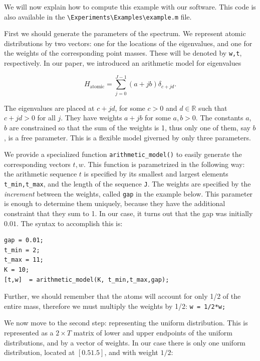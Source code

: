 \documentclass[english,11pt]{article} %
\begin{document}
We will now explain how to compute this example with our software. This code is also available in the \verb+\Experiments\Examples\example.m+ file.  

First we should generate the parameters of the spectrum. We represent atomic distributions by two vectors: one for the locations of the eigenvalues, and one for the weights of the corresponding point masses. These will be denoted by \verb+w,t+, respectively. In our paper, we introduced an arithmetic model for eigenvalues 


\begin{equation*}
\label{arithmetic_model}
H_{\mathrm{atomic}} = \sum_{j=0}^{J-1} (a + jb) \delta_{c+jd}.
\end{equation*}

The eigenvalues are placed at $c+jd$, for some $c>0$ and $d \in \mathbb{R}$ such that $c+jd>0$ for all $j$. They have weights $a + jb$ for some $a,b>0$. The constants $a$, $b$ are constrained so that the sum of the weights is 1, thus only one of them, say $b$, is a free parameter. This is a flexible model giverned by only three parameters. 

We provide a specialized function \verb+arithmetic_model()+ to easily generate the corresponding vectors $t,w$. This function is parametrized in the following way: the arithmetic sequence $t$ is specified by its smallest and largest elements \verb+t_min,t_max+, and the length of the sequence \verb+J+. The weights are specified by the \emph{increment} between the weights, called \verb+gap+ in the example below. This parameter is enough to determine them uniquely, because they have the additional constraint that they sum to 1. In our case, it turns out that the gap was initially $0.01$. The syntax to accomplish this is:

\begin{verbatim}
gap = 0.01;
t_min = 2;
t_max = 11;
K = 10;
[t,w]  = arithmetic_model(K, t_min,t_max,gap);
\end{verbatim}

 Further, we should remember that the atoms will account for only 1/2 of the entire mass, therefore we must multiply the weights by 1/2: \verb+w = 1/2*w;+
 
We now move to the second step: representing the uniform distribution. This is represented as a $2 \times T$ matrix of lower and upper endpoints of the uniform distributions, and by a vector of weights.  In our case there is only one uniform distribution, located at $[0.5 1.5]$, and with weight $1/2$: 
\end{document}
